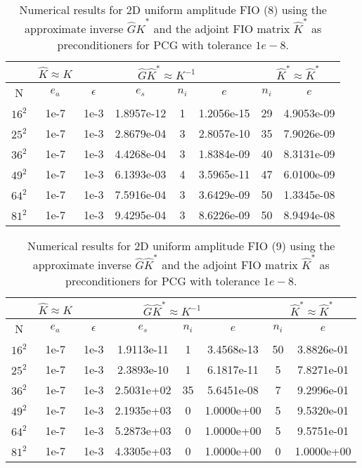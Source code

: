 \documentclass[11pt]{article}
\begin{document}
\begin{table}[!htbp]
\centering
\begin{tabular}{|c|c|c|c|c|c|c|c|}
\hline
\multicolumn{1}{c|}{}& \multicolumn{1}{c|}{$\hat{K} \approx K$} & \multicolumn{4}{c|}{$\hat{G}\hat{K}^{*}\approx K^{-1}$}& \multicolumn{2}{c|}{$\hat{K}^{*} \approx \hat{K}^{*}$}\\
\hline
N & $e_{a}$ & $\epsilon$ & $e_{s}$ & $n_{i}$ & $e$ & $n_{i}$ & $e$ \\ 
\hline
$16^2$ & 1e-7 & 1e-3 & 1.8957e-12 & 1 & 1.2056e-15 & 29 & 4.9053e-09 \\
\hline
$25^2$ & 1e-7 & 1e-3 & 2.8679e-04 & 3 & 2.8057e-10 & 35 & 7.9026e-09 \\
\hline
$36^2$ & 1e-7 & 1e-3 & 4.4268e-04 & 3 & 1.8384e-09 & 40 & 8.3131e-09 \\
\hline
$49^2$ & 1e-7 & 1e-3 & 6.1393e-03 & 4 & 3.5965e-11 & 47 & 6.0100e-09 \\
\hline
$64^2$ & 1e-7 & 1e-3 & 7.5916e-04 & 3 & 3.6429e-09 & 50 & 1.3345e-08 \\
\hline
$81^2$ & 1e-7 & 1e-3 & 9.4295e-04 & 3 & 8.6226e-09 & 50 & 8.9494e-08 \\

\end{tabular}

\caption{Numerical results for 2D uniform amplitude FIO (8) using the approximate inverse $\hat{G}\hat{K}^{*}$ and the adjoint FIO matrix $\hat{K}^{*}$ as preconditioners for PCG with tolerance $1e-8$.}
\label{2d-k3}
\end{table}


\begin{table}[!htbp]
\centering
\begin{tabular}{|c|c|c|c|c|c|c|c|}
\hline
\multicolumn{1}{c|}{}& \multicolumn{1}{c|}{$\hat{K} \approx K$} & \multicolumn{4}{c|}{$\hat{G}\hat{K}^{*}\approx K^{-1}$}& \multicolumn{2}{c|}{$\hat{K}^{*} \approx \hat{K}^{*}$}\\
\hline
N & $e_{a}$ & $\epsilon$ & $e_{s}$ & $n_{i}$ & $e$ & $n_{i}$ & $e$ \\ 
\hline
$16^2$ & 1e-7 & 1e-3 & 1.9113e-11 & 1 & 3.4568e-13 & 50 & 3.8826e-01 \\
\hline
$25^2$ & 1e-7 & 1e-3 & 2.3893e-10 & 1 & 6.1817e-11 & 5 & 7.8271e-01 \\
\hline
$36^2$ & 1e-7 & 1e-3 & 2.5031e+02 & 35 & 5.6451e-08 & 7 & 9.2996e-01 \\
\hline
$49^2$ & 1e-7 & 1e-3 & 2.1935e+03 & 0 & 1.0000e+00 & 5 & 9.5320e-01 \\
\hline
$64^2$ & 1e-7 & 1e-3 & 5.2873e+03 & 0 & 1.0000e+00 & 5 & 9.5751e-01 \\
\hline
$81^2$ & 1e-7 & 1e-3 & 4.3305e+03 & 0 & 1.0000e+00 & 0 & 1.0000e+00 \\

\end{tabular}

\caption{Numerical results for 2D uniform amplitude FIO (9) using the approximate inverse $\hat{G}\hat{K}^{*}$ and the adjoint FIO matrix $\hat{K}^{*}$ as preconditioners for PCG with tolerance $1e-8$.}
\label{2d-k4}
\end{table}
\end{document}
